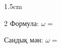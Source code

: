 
\begin{answerboxpart}{1.5cm}
\begin{multicols}{2}
    Формула: \(\omega=\)

    \columnbreak

    Сандық мән: \(\omega=\)
\end{multicols}
\end{answerboxpart}
